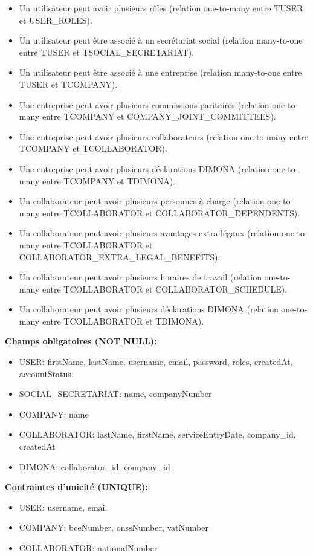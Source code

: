 \documentclass[12pt,a4paper]{report}
\begin{document}
\begin{itemize}
  \item Un utilisateur peut avoir plusieurs rôles (relation one-to-many entre TUSER et USER\_ROLES).
  \item Un utilisateur peut être associé à un secrétariat social (relation many-to-one entre TUSER et TSOCIAL\_SECRETARIAT).
  \item Un utilisateur peut être associé à une entreprise (relation many-to-one entre TUSER et TCOMPANY).
  \item Une entreprise peut avoir plusieurs commissions paritaires (relation one-to-many entre TCOMPANY et COMPANY\_JOINT\_COMMITTEES).
  \item Une entreprise peut avoir plusieurs collaborateurs (relation one-to-many entre TCOMPANY et TCOLLABORATOR).
  \item Une entreprise peut avoir plusieurs déclarations DIMONA (relation one-to-many entre TCOMPANY et TDIMONA).
  \item Un collaborateur peut avoir plusieurs personnes à charge (relation one-to-many entre TCOLLABORATOR et COLLABORATOR\_DEPENDENTS).
  \item Un collaborateur peut avoir plusieurs avantages extra-légaux (relation one-to-many entre TCOLLABORATOR et COLLABORATOR\_EXTRA\_LEGAL\_BENEFITS).
  \item Un collaborateur peut avoir plusieurs horaires de travail (relation one-to-many entre TCOLLABORATOR et COLLABORATOR\_SCHEDULE).
  \item Un collaborateur peut avoir plusieurs déclarations DIMONA (relation one-to-many entre TCOLLABORATOR et TDIMONA).
\end{itemize}

\textbf{Champs obligatoires (NOT NULL):}
\begin{itemize}
  \item USER: firstName, lastName, username, email, password, roles, createdAt, accountStatus
  \item SOCIAL\_SECRETARIAT: name, companyNumber
  \item COMPANY: name
  \item COLLABORATOR: lastName, firstName, serviceEntryDate, company\_id, createdAt
  \item DIMONA: collaborator\_id, company\_id
\end{itemize}

\textbf{Contraintes d'unicité (UNIQUE):}
\begin{itemize}
  \item USER: username, email
  \item COMPANY: bceNumber, onssNumber, vatNumber
  \item COLLABORATOR: nationalNumber
\end{itemize}
\end{document}
